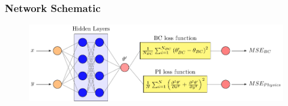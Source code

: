 
\begin{frame}
    \frametitle{Network Schematic}
    \begin{figure}
        \centering
        \includegraphics[scale=0.77]{00_schematic/02_PINN_schematic/PINN_HC_schematic.pdf}
    \end{figure}
\end{frame}
